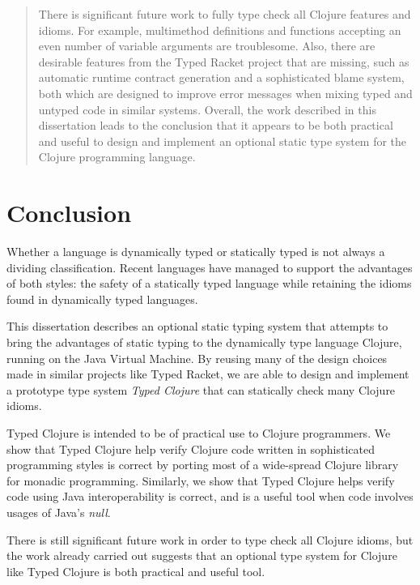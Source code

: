 \documentclass{cshonours}
\begin{document}
\begin{abstract}
There is significant future work to fully type check all Clojure features and idioms.
For example, multimethod definitions and functions accepting an even number of variable arguments
are troublesome. 
Also, there are desirable features from the Typed Racket project that are missing, such
as automatic runtime contract generation and a sophisticated blame system, 
both which are designed to improve error messages when mixing typed and untyped code in similar systems.
Overall, the work described in this dissertation leads to the conclusion that it appears to 
be both practical and useful to design and implement an optional static type system for the
Clojure programming language.

\end{abstract}

\tableofcontents













\chapter{Conclusion}

Whether a language is dynamically typed or statically typed is not always a
dividing classification. Recent languages have managed to support the advantages of both styles:
the safety of a statically typed language while retaining the idioms found in
dynamically typed languages.

This dissertation describes an optional static typing system
that attempts to bring the advantages of static typing to the dynamically type language
Clojure, running on the Java Virtual Machine. 
By reusing many of the design choices made in similar projects
like Typed Racket, we are able to design and implement a prototype type system
\emph{Typed Clojure} that can statically check many Clojure idioms.

Typed Clojure is intended to be of practical use to Clojure programmers.
We show that Typed Clojure help verify Clojure code written in sophisticated
programming styles is correct by porting most of a wide-spread Clojure library for monadic programming.
Similarly, we show that Typed Clojure helps verify code using Java interoperability is correct, and is
a useful tool when code involves usages of Java's \emph{null}.

There is still significant future work in order to type check all Clojure idioms,
but the work already carried out suggests that an optional type system for Clojure
like Typed Clojure is both practical and useful tool.

\printbibliography[title=References]


\end{document}

